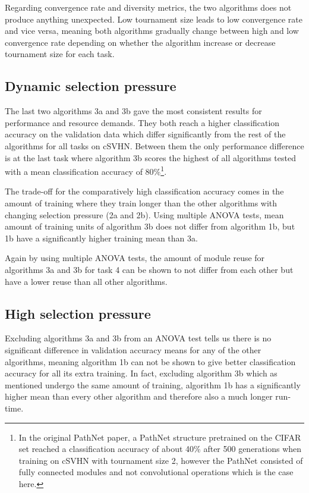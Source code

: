 Regarding convergence rate and diversity metrics, the two algorithms does not produce anything unexpected. Low tournament size leads to low convergence rate and vice versa, meaning both algorithms gradually change between high and low convergence rate depending on whether the algorithm increase or decrease tournament size for each task.

\subsection{Dynamic selection pressure}\label{search-discussion:dynamicselectionpressure}
The last two algorithms 3a and 3b gave the most consistent results for performance and resource demands. They both reach a higher classification accuracy on the validation data which differ significantly from the rest of the algorithms for all tasks on cSVHN. Between them the only performance difference is at the last task where algorithm 3b scores the highest of all algorithms tested with a mean classification accuracy of 80\%\footnote{In the original PathNet paper, a PathNet structure pretrained on the CIFAR set reached a classification accuracy of about 40\% after 500 generations when training on cSVHN with tournament size 2, however the PathNet consisted of fully connected modules and not convolutional operations which is the case here.}.

The trade-off for the comparatively high classification accuracy comes in the amount of training where they train longer than the other algorithms with changing selection pressure (2a and 2b). Using multiple ANOVA tests, mean amount of training units of algorithm 3b does not differ from algorithm 1b, but 1b have a significantly higher training mean than 3a.

Again by using multiple ANOVA tests, the amount of module reuse for algorithms 3a and 3b for task 4 can be shown to not differ from each other but have a lower reuse than all other algorithms. 

\subsection{High selection pressure}
Excluding algorithms 3a and 3b from an ANOVA test tells us there is no significant difference in validation accuracy means for any of the other algorithms, meaning algorithm 1b can not be shown to give better classification accuracy for all its extra training. 
In fact, excluding algorithm 3b which as mentioned undergo the same amount of training, algorithm 1b has a significantly higher mean than every other algorithm and therefore also a much longer run-time. 

